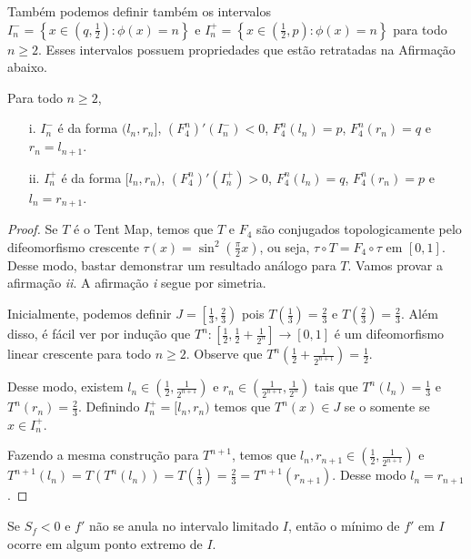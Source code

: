 Também podemos definir também os intervalos
$I^-_n = \left \{ x \in \left ( q, \frac{1}{2} \right ) : \phi(x) = n \right \} \textrm{ e } I^+_n = \left \{ x \in \left ( \frac{1}{2}, p \right ) : \phi(x) = n \right \} $ para todo $n \geq 2$. Esses intervalos possuem propriedades que estão retratadas na Afirmação abaixo.

\begin{affirmation}
Para todo $n \geq 2$,
\begin{enumerate}
\item[i.] $I^-_n$ é da forma $(l_n, r_n]$, $(F_4^n)'(I^-_n) < 0$, $F_4^n(l_n) = p$, $F_4^n(r_n) = q$ e $r_n = l_{n+1}$.
\item[ii.] $I^+_n$ é da forma $[l_n, r_n)$, $(F_4^n)'(I^+_n) > 0$, $F_4^n(l_n) = q$, $F_4^n(r_n) = p$ e $l_n = r_{n+1}$.
\end{enumerate}
\end{affirmation}

\begin{proof}
Se $T$ é o Tent Map, temos que $T$ e $F_4$ são conjugados topologicamente pelo difeomorfismo crescente $\tau(x) = \sin^2 \left( \frac{\pi}{2} x \right)$, ou seja, $\tau \circ T = F_4 \circ \tau$ em $[0, 1]$. Desse modo, bastar demonstrar um resultado análogo para $T$. Vamos provar a afirmação \textit{ii}. A afirmação \textit{i} segue por simetria.

Inicialmente, podemos definir $J = \left[ \frac{1}{3}, \frac{2}{3} \right)$ pois $T\left( \frac{1}{3} \right) = \frac{2}{3}$ e $T\left( \frac{2}{3} \right) = \frac{2}{3}$.
Além disso, é fácil ver por indução que $T^n: \left[ \frac{1}{2}, \frac{1}{2} + \frac{1}{2^n} \right] \to [0, 1]$ é um difeomorfismo linear crescente para todo $n \geq 2$. Observe que $T^n\left( \frac{1}{2} + \frac{1}{2^{n+1}}\right) = \frac{1}{2}$.

Desse modo, existem $l_n \in \left(\frac{1}{2}, \frac{1}{2^{n+1}}\right)$ e $r_n \in \left(\frac{1}{2^{n+1}}, \frac{1}{2^n} \right)$ tais que $T^n(l_n) = \frac{1}{3}$ e $T^n(r_n) = \frac{2}{3}$. Definindo $I^+_n = [l_n, r_n)$ temos que $T^n(x) \in J$ se o somente se $x \in I^+_n$.

Fazendo a mesma construção para $T^{n+1}$, temos que $l_n, r_{n+1} \in \left(\frac{1}{2}, \frac{1}{2^{n+1}}\right)$ e $T^{n+1}(l_n) = T(T^n(l_n)) = T\left(\frac{1}{3}\right) = \frac{2}{3} = T^{n+1}(r_{n+1})$. Desse modo $l_n = r_{n+1}$.
\end{proof}


\begin{affirmation}
Se $S_f < 0$ e $f'$ não se anula no intervalo limitado $I$, então o mínimo de $f'$ em $I$ ocorre em algum ponto extremo de $I$.
\end{affirmation}

